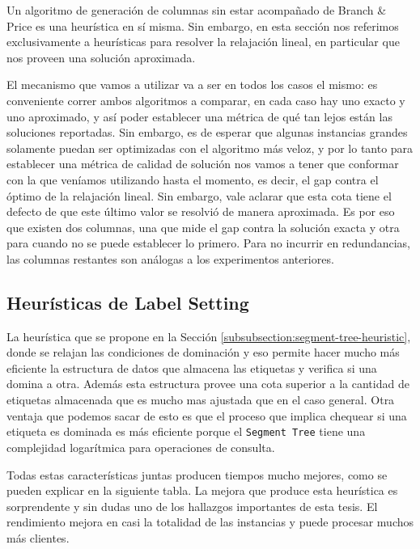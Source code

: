Un algoritmo de generación de columnas sin estar acompañado de Branch \& Price es una heurística en sí misma. Sin embargo, en esta sección nos referimos exclusivamente a heurísticas para resolver la relajación lineal, en particular que nos proveen una solución aproximada. 

El mecanismo que vamos a utilizar va a ser en todos los casos el mismo: es conveniente correr ambos algoritmos a comparar, en cada caso hay uno exacto y uno aproximado, y así poder establecer una métrica de qué tan lejos están las soluciones reportadas. Sin embargo, es de esperar que algunas instancias grandes solamente puedan ser optimizadas con el algoritmo más veloz, y por lo tanto para establecer una métrica de calidad de solución nos vamos a tener que conformar con la que veníamos utilizando hasta el momento, es decir, el gap contra el óptimo de la relajación lineal. Sin embargo, vale aclarar que esta cota tiene el defecto de que este último valor se resolvió de manera aproximada. Es por eso que existen dos columnas, una que mide el gap contra la solución exacta y otra para cuando no se puede establecer lo primero. Para no incurrir en redundancias, las columnas restantes son análogas a los experimentos anteriores.

\subsection{Heurísticas de Label Setting}
\label{section:experiments-label-setting-heur}

La heurística que se propone en la Sección \ref{subsubsection:segment-tree-heuristic}, donde se relajan las condiciones de dominación y eso permite hacer mucho más eficiente la estructura de datos que almacena las etiquetas y verifica si una domina a otra. Además esta estructura provee una cota superior a la cantidad de etiquetas almacenada que es mucho mas ajustada que en el caso general. Otra ventaja que podemos sacar de esto es que el proceso que implica chequear si una etiqueta es dominada es más eficiente porque el \texttt{Segment Tree} tiene una complejidad logarítmica para operaciones de consulta. 

Todas estas características juntas producen tiempos mucho mejores, como se pueden explicar en la siguiente tabla. La mejora que produce esta heurística es sorprendente y sin dudas uno de los hallazgos importantes de esta tesis. El rendimiento mejora en casi la totalidad de las instancias y puede procesar muchos más clientes.

